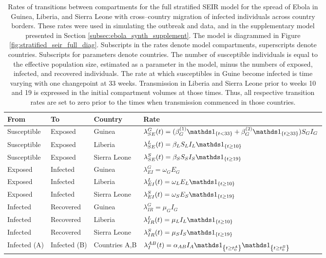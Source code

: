 \begin{table}[htbp]
	\caption[Transmission rates for the stratified SEIR model with migration of infecteds for Ebola in West Africa.]{Rates of transitions between compartments for the full stratified SEIR model for the spread of Ebola in Guinea, Liberia, and Sierra Leone with cross--country migration of infected individuals across country borders. These rates were used in simulating the outbreak and data, and in the supplementary model presented in Section \ref{subsec:ebola_synth_supplement}. The model is diagrammed in Figure \ref{fig:stratified_seir_full_diag}. Subscripts in the rates denote model compartments, superscripts denote countries. Subscripts for parameters denote countries. The number of susceptible individuals is equal to the effective population size, estimated as a parameter in the model, minus the numbers of exposed, infected, and recovered individuals. The rate at which susceptibles in Guine become infected is time varying with one changepoint at 33 weeks. Transmission in Liberia and Sierra Leone prior to weeks 10 and 19 is expressed in the initial compartment volumes at those times. Thus, all respective transition rates are set to zero prior to the times when transmission commenced in those countries.}
	\label{tab:ebola_synth_rates_full}
	\centering\footnotesize
	\begin{tabular}{llll}
		\hline
		\textbf{From} & \textbf{To} & \textbf{Country} & \textbf{Rate} \\
		\hline
		Susceptible & Exposed & Guinea & $ \lambda_{SE}^G(t) = (\beta_G^{(1)} \ind{t<33} + \beta_G^{(2)}\ind{t\geq33})S_GI_G $ \\
		Susceptible & Exposed & Liberia & $ \lambda_{SE}^L(t) = \beta_LS_LI_L\ind{t\geq10} $\\
		Susceptible & Exposed & Sierra Leone & $ \lambda_{SE}^S(t) = \beta_SS_SI_S\ind{t\geq19} $ \\
		Exposed & Infected & Guinea & $ \lambda_{EI}^G = \omega_GE_G $\\
		Exposed & Infected & Liberia & $ \lambda_{EI}^L(t) = \omega_LE_L\ind{t\geq10} $ \\
		Exposed & Infected & Sierra Leone & $\lambda_{EI}^S(t) = \omega_SE_S\ind{t\geq19}$ \\
		Infected & Recovered & Guinea & $ \lambda_{IR}^G = \mu_GI_G $ \\
		Infected & Recovered & Liberia & $ \lambda_{IR}^L(t) = \mu_LI_L\ind{t\geq10} $ \\	
		Infected & Recovered & Sierra Leone & $ \lambda_{IR}^S(t) = \mu_SI_S\ind{t\geq19} $ \\
		Infected (A) & Infected (B) & Countries A,B & $ \lambda_I ^{AB}(t) = \alpha_{AB}I_A\ind{t\geq{t_{0}^A}}\ind{t\geq t_{0}^B}$\\
		\hline
	\end{tabular}
\end{table}

